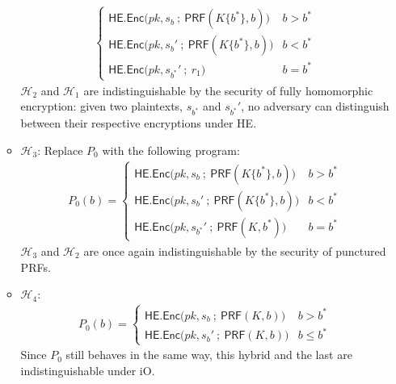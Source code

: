 \documentclass{article}
\begin{document}
\begin{itemize}
\begin{itemize}
\begin{align}
\begin{cases}
                \textsf{HE.Enc}\big( pk, s_b \:;\: \textsf{PRF}(K\{b^*\}, b) \big) & b > b^* \\
                \textsf{HE.Enc}\big( pk, s_b' \:;\: \textsf{PRF}(K\{b^*\}, b) \big) & b < b^* \\
                \textsf{HE.Enc}\big( pk, s_{b^*}' \:;\: r_1 \big) & b = b^*
            \end{cases}
        \end{align}
        $\mathcal{H}_2$ and $\mathcal{H}_1$ are indistinguishable by the security of fully homomorphic encryption: given two plaintexts, $s_{b^*}$ and $s_{b^*}'$, no adversary can distinguish between their respective encryptions under \textsf{HE}.
        \item $\mathcal{H}_3$: Replace $P_0$ with the following program:
        \begin{align}
            P_0(b) =
            \begin{cases}
                \textsf{HE.Enc}\big( pk, s_b \:;\: \textsf{PRF}(K\{b^*\}, b) \big) & b > b^* \\
                \textsf{HE.Enc}\big( pk, s_b' \:;\: \textsf{PRF}(K\{b^*\}, b) \big) & b < b^* \\
                \textsf{HE.Enc}\big( pk, s_{b^*}' \:;\: \textsf{PRF}(K, b^*) \big) & b = b^*
            \end{cases}
        \end{align}
        $\mathcal{H}_3$ and $\mathcal{H}_2$ are once again indistinguishable by the security of punctured PRFs.
        \item $\mathcal{H}_4$:
        \begin{align}
            P_0(b) =
            \begin{cases}
                \textsf{HE.Enc}\big( pk, s_b \:;\: \textsf{PRF}(K, b) \big) & b > b^* \\
                \textsf{HE.Enc}\big( pk, s_b' \:;\: \textsf{PRF}(K, b) \big) & b \leq b^*
            \end{cases}
        \end{align}
        Since $P_0$ still behaves in the same way, this hybrid and the last are indistinguishable under \textsf{iO}.
    \end{itemize}
    

\end{itemize}
\end{document}
